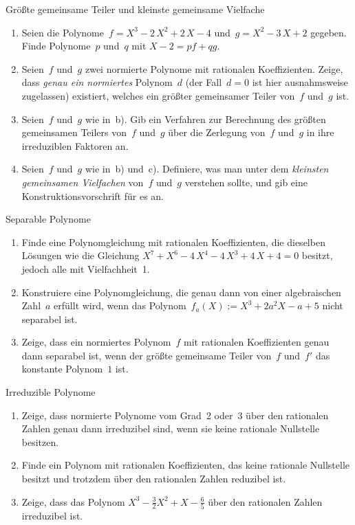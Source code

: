 \documentclass{algblatt}
\begin{document}
\vspace*{-1.5cm}
\vspace*{-0.3cm}

\begin{aufgabe}{Größte gemeinsame Teiler und kleinste gemeinsame Vielfache}
\begin{enumerate}
\item Seien die Polynome~$f = X^3 - 2\,X^2 + 2\,X - 4$
und~$g = X^2 - 3\,X + 2$ gegeben. Finde Polynome~$p$ und~$q$ mit
$X-2 = p f + q g$.
\item Seien~$f$ und~$g$ zwei normierte Polynome mit rationalen
Koeffizienten. Zeige, dass \emph{genau ein normiertes} Polynom~$d$ (der
Fall~$d = 0$ ist hier ausnahmsweise zugelassen) existiert, welches ein
größter gemeinsamer Teiler von~$f$ und~$g$ ist.
\item Seien~$f$ und~$g$ wie in~b).
Gib ein Verfahren zur Berechnung des größten gemeinsamen Teilers
von~$f$ und~$g$ über die Zerlegung von~$f$ und~$g$ in ihre
irreduziblen Faktoren an.
\item Seien~$f$ und~$g$ wie in~b) und~c). Definiere, was man unter dem
\emph{kleinsten gemeinsamen Vielfachen} von~$f$ und~$g$ verstehen sollte,
und gib eine Konstruktionsvorschrift für es an.
\end{enumerate}
\end{aufgabe}

\begin{aufgabe}{Separable Polynome}
\begin{enumerate}
\item Finde eine Polynomgleichung mit rationalen
Koeffizienten, die dieselben Lösungen wie die
Gleichung $X^7+X^6-4\,X^4-4\,X^3+4\,X+4=0$ besitzt, jedoch alle mit
Vielfachheit~1.
\item Konstruiere eine Polynomgleichung, die genau dann
von einer algebraischen Zahl~$a$ erfüllt wird, wenn das Polynom~$f_a(X) := X^3
+ 2a^2 X - a + 5$ nicht separabel ist.
\item Zeige, dass ein normiertes Polynom~$f$ mit rationalen Koeffizienten genau
dann separabel ist, 
wenn der größte gemeinsame Teiler von~$f$
und~$f'$ das konstante Polynom~$1$ ist.
\end{enumerate}
\end{aufgabe}

\begin{aufgabe}{Irreduzible Polynome}
\begin{enumerate}
\item Zeige, dass normierte Polynome vom Grad~2 oder~3 über den rationalen
Zahlen genau dann irreduzibel sind, wenn sie keine rationale Nullstelle
besitzen.
\item Finde ein Polynom mit rationalen Koeffizienten, das keine rationale
Nullstelle besitzt und trotzdem über den rationalen Zahlen reduzibel ist.
\item Zeige, dass das Polynom $X^3 - \frac{3}{2}X^2 + X - \frac{6}{5}$ über den
rationalen Zahlen irreduzibel ist.
\end{enumerate}
\end{aufgabe}
\end{document}
